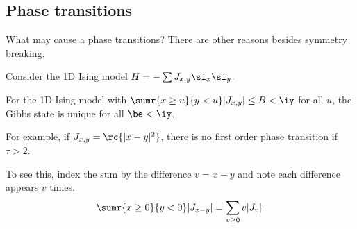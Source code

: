 
\subsection{Phase transitions}





What may cause a phase transitions? There are other reasons besides symmetry breaking.

Consider the 1D Ising model $H=-\sum J_{x,y} \si_x\si_y$. 

\begin{thm}
For the 1D Ising model with $\sumr{x\ge u}{y<u}|J_{x,y}|\le B<\iy$ for all $u$, the Gibbs state is unique for all $\be<\iy$.
\end{thm}
For example, if $J_{x,y} = \rc{|x-y|^2}$, there is no first order phase transition if $\tau>2$.

To see this, index the sum by the difference $v=x-y$ and note each difference appears $v$ times.
\[\sumr{x\ge 0}{y<0}|J_{x-y}| = \sum_{v\ge 0} v|J_v|.
\]

